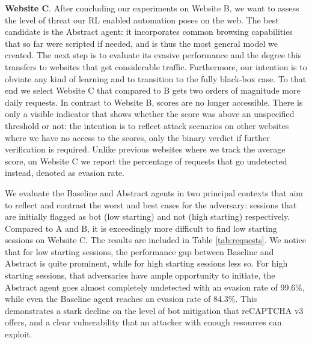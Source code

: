 \textbf{Website C}. After concluding our experiments on Website B, we want to assess the level of threat our \gls{RL} enabled automation poses on the web.
The best candidate is the Abstract agent: it incorporates common browsing capabilities that so far were scripted if needed, and is thus the most general model we created.
The next step is to evaluate its evasive performance and the degree this transfers to websites that get considerable traffic.
Furthermore, our intention is to obviate any kind of learning and to transition to the fully black-box case.
To that end we select Website C that compared to B gets two orders of magnitude more daily requests.
In contrast to Website B, scores are no longer accessible.
There is only a visible indicator that shows whether the score was above an unspecified threshold or not: the intention is to reflect attack scenarios on other websites where we have no access to the scores, only the binary verdict if further verification is required.
Unlike previous websites where we track the average score, on Website C we report the percentage of requests that go undetected instead, denoted as evasion rate.

We evaluate the Baseline and Abstract agents in two principal contexts that aim to reflect and contrast the worst and best cases for the adversary: sessions that are initially flagged as bot (low starting) and not (high starting) respectively.
Compared to A and B, it is exceedingly more difficult to find low starting sessions on Website C.
The results are included in Table \ref{tab:requests}.
We notice that for low starting sessions, the performance gap between Baseline and Abstract is quite prominent, while for high starting sessions less so.
For high starting sessions, that adversaries have ample opportunity to initiate, the Abstract agent goes almost completely undetected with an evasion rate of 99.6\%, while even the Baseline agent reaches an evasion rate of 84.3\%.
This demonstrates a stark decline on the level of bot mitigation that reCAPTCHA v3 offers, and a clear vulnerability that an attacker with enough resources can exploit.

